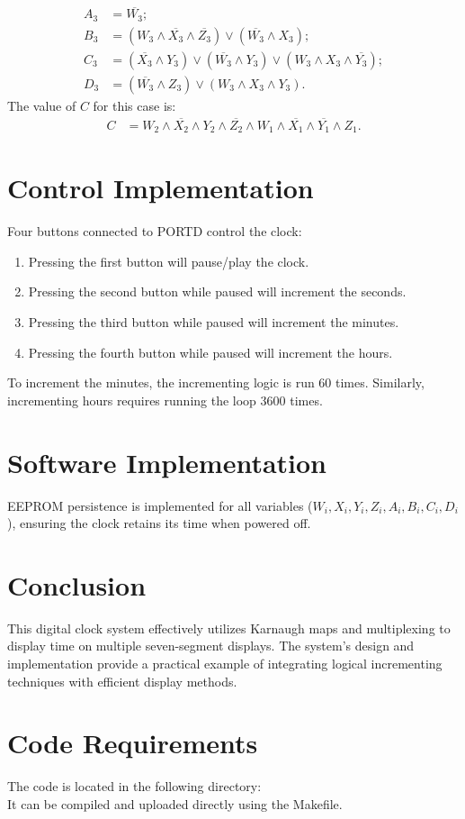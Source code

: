 \documentclass[journal]{IEEEtran}
\begin{document}
	\begin{align}
		A_3 &= \overline{W_3}; \\
		B_3 &= (W_3 \land \overline{X_3} \land \overline{Z_3}) \lor (\overline{W_3} \land X_3);\\
		C_3 &= (\overline{X_3} \land Y_3) \lor (\overline{W_3} \land Y_3) \lor (W_3 \land X_3 \land \overline{Y_3});\\
		D_3 &= (\overline{W_3} \land Z_3) \lor (W_3 \land X_3 \land Y_3).
	\end{align}
	The value of $C$ for this case is:
	\begin{align}
		C &= W_2 \land \overline{X_2} \land Y_2 \land \overline{Z_2} \land W_1 \land \overline{X_1} \land \overline{Y_1} \land Z_1.
	\end{align}
	
	\section{Control Implementation}
	Four buttons connected to PORTD control the clock:
	\begin{enumerate}
		\item Pressing the first button will pause/play the clock.
		\item Pressing the second button while paused will increment the seconds.
		\item Pressing the third button while paused will increment the minutes.
		\item Pressing the fourth button while paused will increment the hours.
	\end{enumerate}
	To increment the minutes, the incrementing logic is run 60 times. Similarly, incrementing hours requires running the loop 3600 times.
	
	\section{Software Implementation}
	EEPROM persistence is implemented for all variables ($W_i, X_i, Y_i, Z_i, A_i, B_i, C_i, D_i$), ensuring the clock retains its time when powered off.
	
	\section{Conclusion}
	This digital clock system effectively utilizes Karnaugh maps and multiplexing to display time on multiple seven-segment displays. The system's design and implementation provide a practical example of integrating logical incrementing techniques with efficient display methods.

	\section*{Code Requirements}
	The code is located in the following directory:\\   It can be compiled and uploaded directly using the Makefile.
	
\end{document}
